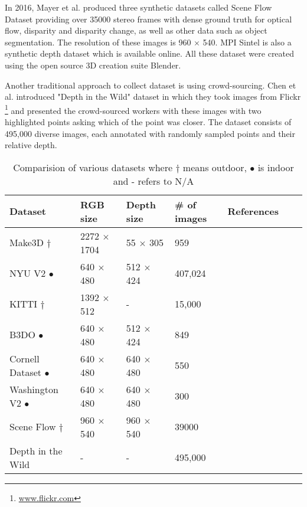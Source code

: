 In 2016, Mayer et al. \cite{MIFDB16} produced three synthetic datasets called Scene Flow Dataset providing over 35000 stereo frames with dense ground truth for optical flow, disparity and disparity change, as well as other data such as object segmentation. The resolution of these images is 960 $\times$ 540. MPI Sintel \cite{Butler:ECCV:2012} is also a synthetic depth dataset which is available online. All these dataset were created using the open source 3D creation suite Blender.

Another traditional approach to collect dataset is using crowd-sourcing. Chen et al. \cite{DBLP:journals/corr/ChenFYD16} introduced "Depth in the Wild" dataset in which they took images from Flickr \footnote{ \url{www.flickr.com}}  and presented the crowd-sourced workers with these images with two highlighted points asking which of the point was closer. The dataset consists of 495,000 diverse images, each annotated with randomly sampled points and their relative depth. 

\begin{table}[]
\begin{tabular}{lllllll}
\hline
{\textbf{Dataset}}         & \textbf{RGB size}           & \textbf{Depth size} & \textbf {\# of images} & \textbf{References}                                  \\ \hline
Make3D  $\dagger$                     & 2272 $\times$ 1704                & 55 $\times$ 305           & 959                       & \cite{saxena2008make3d}               \\ \hline
NYU V2 $\bullet$                      & 640 $\times$ 480                  & 512 $\times$ 424          & 407,024                   & \cite{Silberman:ECCV12}             \\ \hline
KITTI  $\dagger$ & 1392 $\times$ 512  & -                         & 15,000                    & \cite{Geiger2013IJRR}               \\ \hline
B3DO  $\bullet$                      & 640 $\times$ 480                  & 512 $\times$ 424          & 849                       & \cite{Janoch:EECS-2012-85}          \\ \hline
Cornell Dataset 	$\bullet$           & 640 $\times$ 480                  & 640 $\times$ 480          & 550                       & \cite{3Dscene}                      \\ \hline
Washington V2  $\bullet$  & 640 $\times$ 480                  & 640 $\times$ 480          & 300                       & \cite{Washington}                   \\ \hline
Scene Flow  $\dagger$                      & 960 $\times$ 540                  & 960 $\times$ 540          & 39000                     & \cite{MIFDB16}                      \\ \hline
Depth in the Wild                            & -                                 & -                         & 495,000                   & \cite{DBLP:journals/corr/ChenFYD16} \\ \hline
\end{tabular}
\caption{Comparision of various datasets where $\dagger$ means outdoor, $\bullet$ is indoor and - refers to N/A}
\label{table:DatasetComparision}
\end{table}

